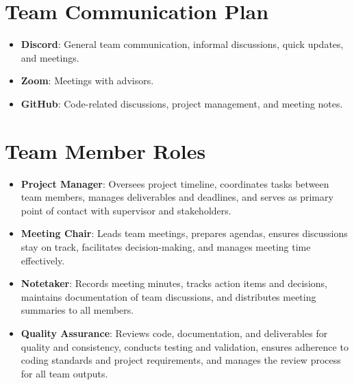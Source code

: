 \documentclass{article}
\begin{document}




\section{Team Communication Plan}

\begin{itemize}
  \item \textbf{Discord}: General team communication, informal discussions, quick updates, and meetings.
  \item \textbf{Zoom}: Meetings with advisors.
  \item \textbf{GitHub}: Code-related discussions, project management, and meeting notes.
\end{itemize}


\section{Team Member Roles}


\begin{itemize}
  \item \textbf{Project Manager}: Oversees project timeline, coordinates tasks between team members, manages deliverables and deadlines, and serves as primary point of contact with supervisor and stakeholders.
  \item \textbf{Meeting Chair}: Leads team meetings, prepares agendas, ensures discussions stay on track, facilitates decision-making, and manages meeting time effectively.
  \item \textbf{Notetaker}: Records meeting minutes, tracks action items and decisions, maintains documentation of team discussions, and distributes meeting summaries to all members.
  \item \textbf{Quality Assurance}: Reviews code, documentation, and deliverables for quality and consistency, conducts testing and validation, ensures adherence to coding standards and project requirements, and manages the review process for all team outputs.
\end{itemize}
\end{document}
